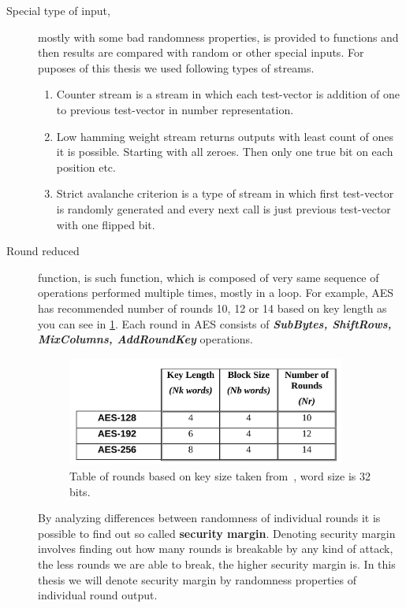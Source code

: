 \documentclass[
    digital,    %
    oneside,    %
    color,
    11pt,
    nocover,
    notable,
    nolof,
    nolot,
    final
]{fithesis3}
\begin{document}
\begin{description}
	\item[Special type of input,] mostly with some bad randomness properties, is provided to functions and then results are compared with random or other special inputs. For puposes of this thesis we used following types of streams.
	\begin{enumerate}
		\item Counter stream is a stream in which each test-vector is addition of one to previous test-vector in number representation.
		\item Low hamming weight stream returns outputs with least count of ones it is possible. Starting with all zeroes. Then only one true bit on each position etc.
		\item Strict avalanche criterion is a type of stream in which first test-vector is randomly generated and every next call is just previous test-vector with one flipped bit.
	\end{enumerate}


	\item[Round reduced] function, is such function, which is composed of very same sequence of operations performed multiple times, mostly in a loop. For example, AES~\cite{FIPS-197} has recommended number of rounds 10, 12 or 14 based on key length as you can see in \cref{fig:fips197-rounds}. Each round in AES consists of \textbf{\textit{SubBytes, ShiftRows, MixColumns, AddRoundKey}} operations.
	
	\begin{figure}[h]
		\centering
		\includegraphics[width=0.9\textwidth]{./images/pictures/FIPS197-Nr-table.png}
		\caption{Table of rounds based on key size taken from~\cite{FIPS-197}, word size is 32 bits.}
		\label{fig:fips197-rounds}
	\end{figure}

	By analyzing differences between randomness of individual rounds it is possible to find out so called \textbf{security margin}. Denoting security margin involves finding out how many rounds is breakable by any kind of attack, the less rounds we are able to break, the higher security margin is. In this thesis we will denote security margin by randomness properties of individual round output.
	

\end{description}
\end{document}
